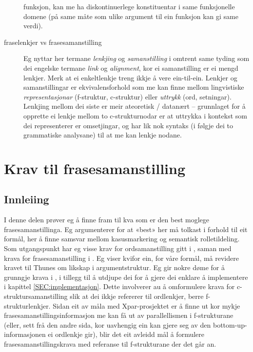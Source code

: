 \documentclass[11pt,a4paper,oneside,draft]{book}
\begin{document}
\begin{description}
  funksjon, kan me ha diskontinuerlege konstituentar i same
  funksjonelle domene (på same måte som ulike argument til ein
  funksjon kan gi same verdi).
\item [fraselenkjer vs frasesamanstilling] Eg nyttar her termane
  \emph{lenkjing} og \emph{samanstilling} i omtrent same tyding som dei engelske
  termane \emph{link} og \emph{alignment}, kor ei samanstilling er ei mengd
  lenkjer. Merk at ei enkeltlenkje treng ikkje å vere ein-til-ein.
  Lenkjer og samanstillingar er ekvivalensforhold som me kan finne
  mellom lingvistiske \emph{representasjonar} (f-struktur, c-struktur)
  eller \emph{uttrykk} (ord, setningar). Lenkjing mellom dei siste er meir
  ateoretisk / datanært -- grunnlaget for å opprette ei lenkje mellom
  to c-strukturnodar er at uttrykka i kontekst som dei representerer
  er omsetjingar, og har lik nok syntaks (i følgje dei to grammatiske
  analysane) til at me kan lenkje nodane.
\end{description}
\chapter{Krav til frasesamanstilling}
\label{sec-3}

\label{SEC:ideell}

\section{Innleiing}
\label{sec-3.1}

I denne delen prøver eg å finne fram til kva som er den best moglege
frasesamanstillinga. Eg argumenterer for at «best» her må tolkast i
forhold til eit formål, her å finne samsvar mellom kasusmarkering og
semantisk rolletildeling. Som utgangspunkt har eg visse krav for
ordsamanstilling gitt i \citet{thunes2003eal}, saman med krava for
frasesamanstilling i \citet{dyvik2009lmp}. Eg viser kvifor ein, for
våre formål, må revidere kravet til Thunes om likskap i
argumentstruktur. Eg gir nokre døme for å grunngje krava i
\citet{dyvik2009lmp}, i tillegg til å utdjupe dei for å gjere dei
enklare å implementere i kapittel \ref{SEC:implementasjon}. Dette
involverer au å omformulere krava for c-struktursamanstilling slik at
dei ikkje refererer til ordlenkjer, berre f-strukturlenkjer. Sidan eit
av måla med Xpar-prosjektet er å finne ut kor mykje
frasesamanstillingsinformasjon me kan få ut av parallellismen i
f-strukturane (eller, sett frå den andre sida, kor uavhengig ein kan
gjere seg av den bottom-up-informasjonen ei ordlenkje gir), blir det
eit avleidd mål å formulere frasesamanstillingskrava med referanse til
f-strukturane der det går an.
\end{document}

